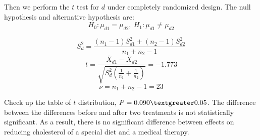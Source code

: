 \documentclass[11pt,a4paper,onside,UTF8]{article}
\begin{document}
Then we perform the $t$ test for $d$ under completely randomized design. 
The null hypothesis and alternative hypothesis are:
\begin{equation}
	H_0: \mu_{d1}=\mu_{d2}, \ H_1: \mu_{d1} \neq \mu_{d2}
\end{equation}

\begin{equation}
	S_d^2=\frac{(n_1-1)S_{d1}^2+(n_2-1)S_{d2}^2}{n_1+n_2-1}
\end{equation}
\begin{equation}
	t=\frac{\bar{X}_{d1}-\bar{X}_{d2}}{\sqrt{S_d^2\left(\frac{1}{n_1}+\frac{1}{n_2}\right)}}=-1.773
\end{equation}
\begin{equation}
	\nu = n_1+n_2-1=23
\end{equation}

Check up the table of $t$ distribution, $P = 0.090 \textgreater 0.05$. 
The difference between the differences before and after two treatments is not statistically significant.
As a result, there is no significant difference between effects on reducing cholesterol of a special diet and a medical therapy.
\end{document}

